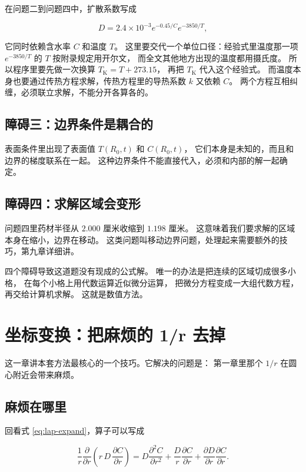 在问题二到问题四中，扩散系数写成

\begin{equation}
D = 2.4\times10^{-3}e^{-0.45/C}e^{-3850/T},
\end{equation}

它同时依赖含水率 $C$ 和温度 $T$。
这里要交代一个单位口径：经验式里温度那一项 $e^{-3850/T}$ 的 $T$
按附录规定用开尔文，
而全文其他地方出现的温度都用摄氏度。
所以程序里要先做一次换算 $T_{\mathrm{K}}=T+273.15$，
再把 $T_{\mathrm{K}}$ 代入这个经验式。
而温度本身也要通过传热方程求解，传热方程里的导热系数 $k$ 又依赖 $C$。
两个方程互相纠缠，必须联立求解，不能分开各算各的。

\subsection{障碍三：边界条件是耦合的}

表面条件里出现了表面值 $T(R_0,t)$ 和 $C(R_0,t)$，
它们本身是未知的，而且和边界的梯度联系在一起。
这种边界条件不能直接代入，必须和内部的解一起确定。

\subsection{障碍四：求解区域会变形}

问题四里药材半径从 $2.000$ 厘米收缩到 $1.198$ 厘米。
这意味着我们要求解的区域本身在缩小，边界在移动。
这类问题叫移动边界问题，处理起来需要额外的技巧，第九章详细讲。

\keypoint
四个障碍导致这道题没有现成的公式解。
唯一的办法是把连续的区域切成很多小格，
在每个小格上用代数运算近似微分运算，
把微分方程变成一大组代数方程，再交给计算机求解。
这就是数值方法。

\section{坐标变换：把麻烦的 1/r 去掉}

这一章讲本套方法最核心的一个技巧。它解决的问题是：
第一章里那个 $1/r$ 在圆心附近会带来麻烦。

\subsection{麻烦在哪里}

回看式 \eqref{eq:lap-expand}，算子可以写成

\begin{equation}
\frac{1}{r}\frac{\partial}{\partial r}\left(r\,D\,\frac{\partial C}{\partial r}\right)
= D\frac{\partial^2 C}{\partial r^2}
+ \frac{D}{r}\frac{\partial C}{\partial r}
+ \frac{\partial D}{\partial r}\frac{\partial C}{\partial r}.
\label{eq:singular}
\end{equation}

